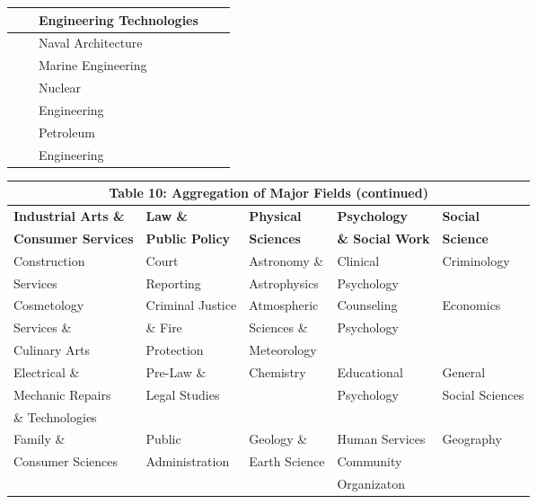 \documentclass[11pt]{article}
\theoremstyle{definition}
\begin{document}
\begin{center}
\begin{tabular}{|l| l| l| l |l|}
  &  & Engineering Technologies & & \\
  \hline \rowcolor{Gray}
   &  & Naval Architecture & & \\
 \rowcolor{Gray}
  &  & Marine Engineering& & \\
  \hline
  &  & Nuclear &  & \\
  &  & Engineering & & \\
\hline \rowcolor{Gray}
 &  & Petroleum & & \\
 \rowcolor{Gray}
 &  & Engineering & & \\
 \hline\hline
\end{tabular} 
\endgroup
\end{center}


\newpage
\vspace{2.5mm}
\noindent
\begin{center}
\begingroup \scriptsize
\begin{tabular}{|l| l| l| l |l|}
\hline\hline
\multicolumn{5}{c}{\textbf{Table 10: Aggregation of Major Fields (continued)}} \\
\hline\hline 
\textbf{Industrial Arts \&} & \textbf{Law \&} & \textbf{Physical} & \textbf{Psychology} & \textbf{Social}  \\
 \textbf{Consumer Services} &\textbf{Public Policy} & \textbf{Sciences} &\textbf{\& Social Work} &  \textbf{Science}   \\ 
 \hline\hline \rowcolor{Gray} 
 Construction & Court & Astronomy \& & Clinical &Criminology \\ 
 \rowcolor{Gray}
Services & Reporting & Astrophysics & Psychology &  \\
 \hline
 Cosmetology & Criminal Justice & Atmospheric & Counseling & Economics \\
Services \& &  \& Fire & Sciences \& & Psychology & \\
 Culinary Arts & Protection & Meteorology & & \\
 \hline \rowcolor{Gray}
 Electrical \& &  Pre-Law \& & Chemistry & Educational & General \\
 \rowcolor{Gray}
 Mechanic Repairs & Legal Studies & & Psychology & Social Sciences\\
 \rowcolor{Gray}
 \& Technologies & & & & \\
 \hline
Family  \& & Public & Geology \& & Human Services & Geography \\
Consumer Sciences & Administration & Earth Science & Community &  \\
 & & & Organizaton & \\

\end{tabular}
\end{center}
\end{document}
